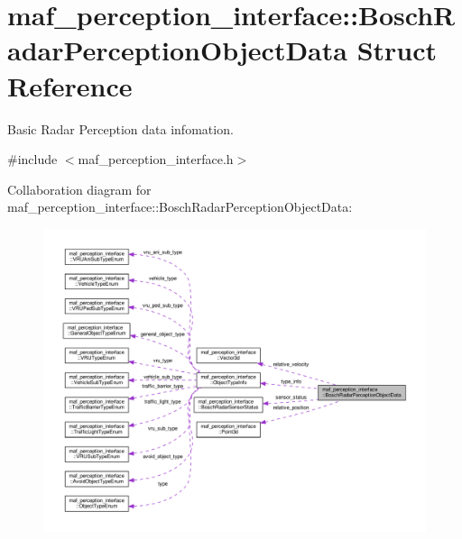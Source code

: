 \hypertarget{structmaf__perception__interface_1_1BoschRadarPerceptionObjectData}{}\section{maf\+\_\+perception\+\_\+interface\+:\+:Bosch\+Radar\+Perception\+Object\+Data Struct Reference}
\label{structmaf__perception__interface_1_1BoschRadarPerceptionObjectData}


Basic Radar Perception data infomation.  




{\ttfamily \#include $<$maf\+\_\+perception\+\_\+interface.\+h$>$}



Collaboration diagram for maf\+\_\+perception\+\_\+interface\+:\+:Bosch\+Radar\+Perception\+Object\+Data\+:\nopagebreak
\begin{figure}[H]
\begin{center}
\leavevmode
\includegraphics[width=350pt]{structmaf__perception__interface_1_1BoschRadarPerceptionObjectData__coll__graph}
\end{center}
\end{figure}
